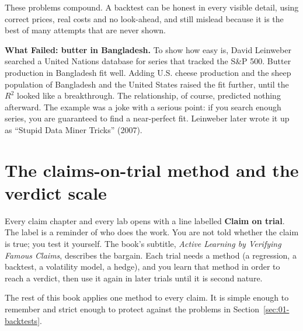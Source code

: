 These problems compound. A backtest can be honest in every visible detail, using correct prices, real costs and no look-ahead, and still mislead because it is the best of many attempts that are never shown.

\begin{callout}
\textbf{What Failed: butter in Bangladesh.} To show how easy  is, David Leinweber searched a United Nations database for series that tracked the S\&P 500. Butter production in Bangladesh fit well. Adding U.S. cheese production and the sheep population of Bangladesh and the United States raised the fit further, until the $R^2$ looked like a breakthrough. The relationship, of course, predicted nothing afterward. The example was a joke with a serious point: if you search enough series, you are guaranteed to find a near-perfect fit. Leinweber later wrote it up as ``Stupid Data Miner Tricks'' (2007).
\end{callout}

\section{The claims-on-trial method and the verdict scale}
\label{sec:01-method}

Every claim chapter and every lab opens with a line labelled \textbf{Claim on trial}. The label is a reminder of who does the work. You are not told whether the claim is true; you test it yourself. The book's subtitle, \emph{Active Learning by Verifying Famous Claims}, describes the bargain. Each trial needs a method (a regression, a backtest, a volatility model, a hedge), and you learn that method in order to reach a verdict, then use it again in later trials until it is second nature.

The rest of this book applies one method to every claim. It is simple enough to remember and strict enough to protect against the problems in Section~\ref{sec:01-backtests}.

